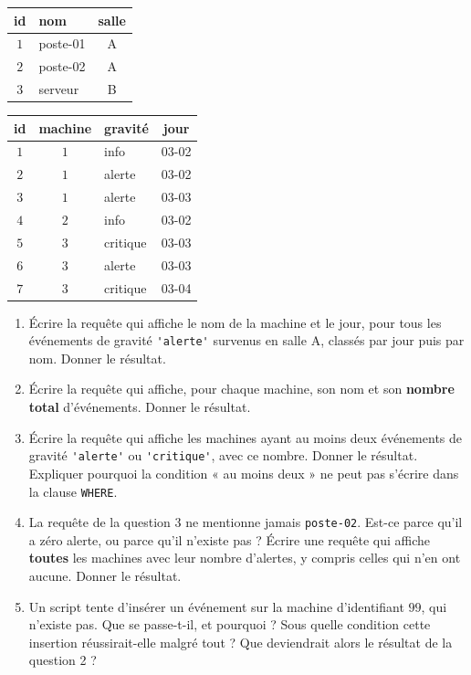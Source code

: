 \begin{center}
\begin{tabular}{|c|l|c|}
\hline
\textbf{id} & \textbf{nom} & \textbf{salle} \\
\hline
$1$ & poste-01 & A \\
\hline
$2$ & poste-02 & A \\
\hline
$3$ & serveur & B \\
\hline
\end{tabular}
\qquad
\begin{tabular}{|c|c|l|c|}
\hline
\textbf{id} & \textbf{machine} & \textbf{gravité} & \textbf{jour} \\
\hline
$1$ & $1$ & info & 03-02 \\
\hline
$2$ & $1$ & alerte & 03-02 \\
\hline
$3$ & $1$ & alerte & 03-03 \\
\hline
$4$ & $2$ & info & 03-02 \\
\hline
$5$ & $3$ & critique & 03-03 \\
\hline
$6$ & $3$ & alerte & 03-03 \\
\hline
$7$ & $3$ & critique & 03-04 \\
\hline
\end{tabular}
\end{center}

\begin{enumerate}
  \item Écrire la requête qui affiche le nom de la machine et le jour, pour tous
    les événements de gravité \lstinline{'alerte'} survenus en salle A, classés
    par jour puis par nom. Donner le résultat.

  \item Écrire la requête qui affiche, pour chaque machine, son nom et son
    \textbf{nombre total} d'événements. Donner le résultat.

  \item Écrire la requête qui affiche les machines ayant au moins deux
    événements de gravité \lstinline{'alerte'} ou \lstinline{'critique'}, avec
    ce nombre. Donner le résultat. Expliquer pourquoi la condition « au moins
    deux » ne peut pas s'écrire dans la clause \lstinline{WHERE}.

  \item La requête de la question 3 ne mentionne jamais \lstinline{poste-02}.
    Est-ce parce qu'il a zéro alerte, ou parce qu'il n'existe pas ? Écrire une
    requête qui affiche \textbf{toutes} les machines avec leur nombre
    d'alertes, y compris celles qui n'en ont aucune. Donner le résultat.

  \item Un script tente d'insérer un événement sur la machine d'identifiant
    $99$, qui n'existe pas. Que se passe-t-il, et pourquoi ? Sous quelle
    condition cette insertion réussirait-elle malgré tout ? Que deviendrait
    alors le résultat de la question 2 ?
\end{enumerate}

